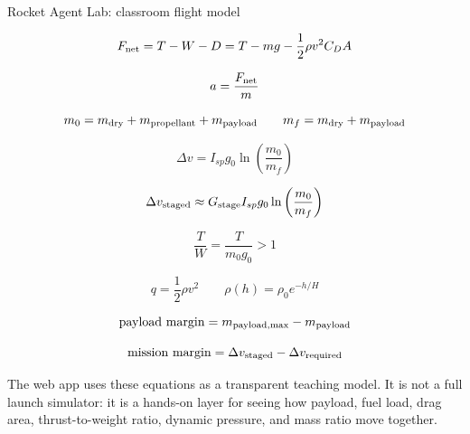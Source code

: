 \documentclass[11pt]{article}
\begin{document}
{\Large Rocket Agent Lab: classroom flight model}

\vspace{0.35in}

\[
F_{\rm net}=T-W-D=T-mg-\frac{1}{2}\rho v^2 C_D A
\]

\[
a=\frac{F_{\rm net}}{m}
\]

\[
m_0=m_{\rm dry}+m_{\rm propellant}+m_{\rm payload}
\qquad
m_f=m_{\rm dry}+m_{\rm payload}
\]

\[
\Delta v=I_{sp}g_0\ln\left(\frac{m_0}{m_f}\right)
\]

\[
\Delta v_{\rm staged}\approx G_{\rm stage}I_{sp}g_0
\ln\left(\frac{m_0}{m_f}\right)
\]

\[
\frac{T}{W}=\frac{T}{m_0g_0}>1
\]

\[
q=\frac{1}{2}\rho v^2
\qquad
\rho(h)=\rho_0e^{-h/H}
\]

\[
{\rm payload\ margin}=m_{\rm payload,max}-m_{\rm payload}
\]

\[
{\rm mission\ margin}=\Delta v_{\rm staged}-\Delta v_{\rm required}
\]

\vspace{0.25in}

The web app uses these equations as a transparent teaching model. It is not a
full launch simulator: it is a hands-on layer for seeing how payload, fuel
load, drag area, thrust-to-weight ratio, dynamic pressure, and mass ratio move
together.
\end{document}
